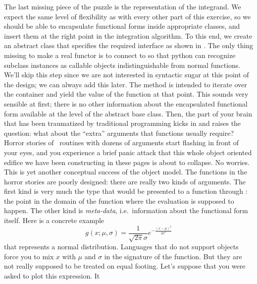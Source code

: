The last missing piece of the puzzle is the representation of the integrand. We expect the same
level of flexibility as with every other part of this exercise, so we should be able to
encapsulate functional forms inside appropriate classes, and insert them at the right point in
the integration algorithm. To this end, we create an abstract class  that
specifies the required interface as shown in . The only thing
missing to make  a real functor is to connect  to
 so that python can recognize subclass instances as callable objects
indistinguishable from normal functions. We'll skip this step since we are not interested in
syntactic sugar at this point of the design; we can always add this later.
%
%
The method  is intended to iterate over the container  and
yield the value of the function at that point. This sounds very sensible at first; there is no
other information about the encapsulated functional form available at the level of the
abstract base class. Then, the part of your brain that has been traumatized by traditional
programming kicks in and raises the question: what about the ``extra'' arguments that functions
usually require? Horror stories of \fortran\ routines with dozens of arguments start flashing
in front of your eyes, and you experience a brief panic attack that this whole object oriented
edifice we have been constructing in these pages is about to collapse. No worries. This is yet
another conceptual success of the object model. The functions in the horror stories are poorly
designed: there are really two kinds of arguments. The first kind is very much the type that
would be presented to a function through : the point in the domain of the
function where the evaluation is supposed to happen. The other kind is {\em meta-data},
i.e.~information about the functional form itself. Here is a concrete example
\begin{equation}
  g(x; \mu,\sigma) = \frac{1}{\sqrt{2\pi} \sigma} e^{-\frac{(x-\mu)^2}{2\sigma^2}}
\end{equation}
that represents a normal distribution. Languages that do not support objects force you to mix
$x$ with $\mu$ and $\sigma$ in the signature of the function. But they are not really supposed
to be treated on equal footing. Let's suppose that you were asked to plot this expression. It

